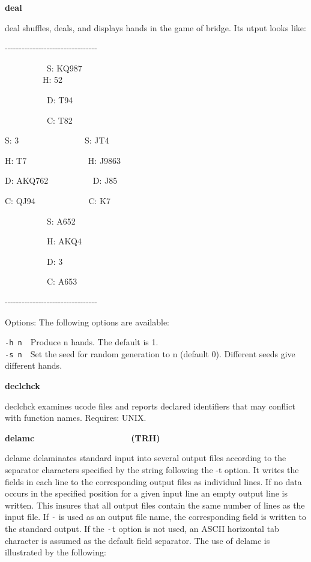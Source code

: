 {{\sffamily\bfseries
deal\ \ \ \ \ \ \ \ \ \ \ \ \ \ \ \ \ \ \ \ \ \ }

\textsf{deal} shuffles, deals, and displays hands in the game of bridge.
Its utput looks like:

{\ttfamily
{}-{}-{}-{}-{}-{}-{}-{}-{}-{}-{}-{}-{}-{}-{}-{}-{}-{}-{}-{}-{}-{}-{}-{}-{}-{}-{}-{}-{}-{}-{}-{}-{}-}

{\ttfamily
\ \ \ \ \ \ \ \ \ \ S: KQ987\\
 \ \ \ \ \ \ \ \ \ H: 52}

{\ttfamily
\ \ \ \ \ \ \ \ \ \ D: T94}

{\ttfamily
\ \ \ \ \ \ \ \ \ \ C: T82}

{\ttfamily
S: 3 \ \ \ \ \ \ \ \ \ \ \ \ \ \ \ S: JT4}

{\ttfamily
H: T7 \ \ \ \ \ \ \ \ \ \ \ \ \ \ H: J9863}

{\ttfamily
D: AKQ762 \ \ \ \ \ \ \ \ \ \ D: J85}

{\ttfamily
C: QJ94 \ \ \ \ \ \ \ \ \ \ \ \ C: K7}

{\ttfamily
\ \ \ \ \ \ \ \ \ \ S: A652}

{\ttfamily
\ \ \ \ \ \ \ \ \ \ H: AKQ4}

{\ttfamily
\ \ \ \ \ \ \ \ \ \ D: 3}

{\ttfamily
\ \ \ \ \ \ \ \ \ \ C: A653}

{\ttfamily
{}-{}-{}-{}-{}-{}-{}-{}-{}-{}-{}-{}-{}-{}-{}-{}-{}-{}-{}-{}-{}-{}-{}-{}-{}-{}-{}-{}-{}-{}-{}-{}-{}-}

Options: The following options are available:

\texttt{{}-h n}\ \ Produce n hands. The default is 1.\\
\texttt{{}-s n}\ \ Set the seed for random generation to n (default 0).
Different seeds give different hands.

{\sffamily\bfseries
declchck\ \ \ \ \ \ \ \ \ \ \ \ \ \ \ \ \ \ \ \ }

\textsf{declchck} examines ucode files and reports declared identifiers
that may conflict with function names. Requires: UNIX. 

{\sffamily\bfseries
delamc\ \ \ \ \ \ \ \ \ \ \ \ \ \ \ \ \ \ \ \ (TRH)}

\textsf{delamc} delaminates standard input into several output files
according to the separator characters specified by the string following
the -t option. It writes the fields in each line to the corresponding
output files as individual lines. If no data occurs in the specified
position for a given input line an empty output line is written. This
insures that all output files contain the same number of lines as the
input file. If \texttt{{}-} is used as an output file name, the
corresponding field is written to the standard output. If the
\texttt{{}-t} option is not used, an ASCII horizontal tab character is
assumed as the default field separator. The use of delamc is
illustrated by the following:

}
